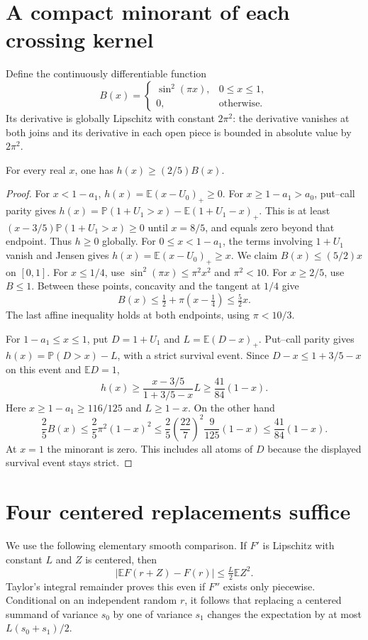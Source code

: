 \documentclass[11pt]{article}
\newcommand{\E}{\mathbb E}\newcommand{\Pp}{\mathbb P}
\begin{document}
\section{A compact minorant of each crossing kernel}
Define the continuously differentiable function
\[
B(x)=
\begin{cases}\sin^2(\pi x),&0\le x\le1,\\0,&\text{otherwise}.\end{cases}
\]
Its derivative is globally Lipschitz with constant $2\pi^2$:
the derivative vanishes at both joins and its derivative in each open
piece is bounded in absolute value by $2\pi^2$.

\begin{lemma}\label{lem:bump}
For every real $x$, one has $h(x)\ge(2/5)B(x)$.
\end{lemma}
\begin{proof}
For $x<1-a_1$, $h(x)=\E(x-U_0)_+\ge0$. For $x\ge1-a_1>a_0$,
put--call parity gives $h(x)=\Pp(1+U_1>x)-\E(1+U_1-x)_+$.
This is at least $(x-3/5)\Pp(1+U_1>x)\ge0$ until $x=8/5$,
and equals zero beyond that endpoint. Thus $h\ge0$ globally.
For $0\le x<1-a_1$, the terms involving $1+U_1$ vanish and Jensen gives
$h(x)=\E(x-U_0)_+\ge x$. We claim $B(x)\le(5/2)x$ on $[0,1]$.
For $x\le1/4$, use $\sin^2(\pi x)\le\pi^2x^2$ and $\pi^2<10$.
For $x\ge2/5$, use $B\le1$. Between these points, concavity and the
tangent at $1/4$ give
\[
B(x)\le\tfrac12+\pi(x-\tfrac14)\le\tfrac52x.
\]
The last affine inequality holds at both endpoints, using $\pi<10/3$.

For $1-a_1\le x\le1$, put $D=1+U_1$ and $L=\E(D-x)_+$.
Put--call parity gives $h(x)=\Pp(D>x)-L$, with a strict survival event.
Since $D-x\le1+3/5-x$ on this event and $\E D=1$,
\[
h(x)\ge\frac{x-3/5}{1+3/5-x}L
\ge\frac{41}{84}(1-x).
\]
Here $x\ge1-a_1\ge116/125$ and $L\ge1-x$.
On the other hand
\[
\frac25B(x)\le\frac25\pi^2(1-x)^2
\le\frac25\left(\frac{22}{7}\right)^2\frac9{125}(1-x)
\le\frac{41}{84}(1-x).
\]
At $x=1$ the minorant is zero. This includes all atoms of $D$ because
the displayed survival event stays strict.
\end{proof}

\section{Four centered replacements suffice}
We use the following elementary smooth comparison. If $F'$ is Lipschitz
with constant $L$ and $Z$ is centered, then
\[
|\E F(r+Z)-F(r)|\le \tfrac L2\E Z^2.
\]
Taylor's integral remainder proves this even if $F''$ exists only
piecewise. Conditional on an independent random $r$, it follows that
replacing a centered summand of variance $s_0$ by one of variance $s_1$
changes the expectation by at most $L(s_0+s_1)/2$.
\end{document}
